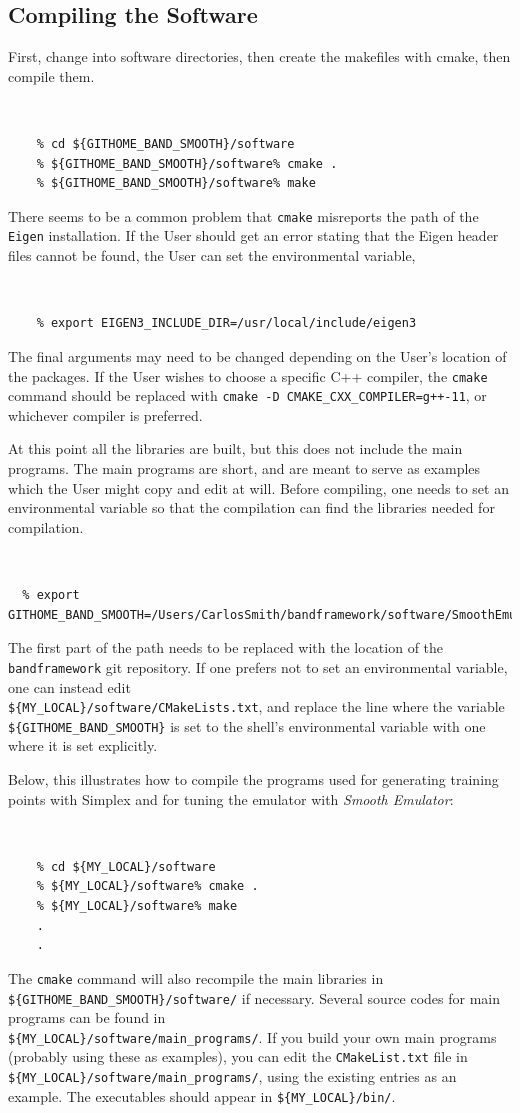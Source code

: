 \documentclass[UserManual.tex]{subfiles}
\begin{document}
\subsection{Compiling the Software}

First, change into software directories, then create the makefiles with cmake, then compile them.
{\tt 
\begin{verbatim}
    % cd ${GITHOME_BAND_SMOOTH}/software
    % ${GITHOME_BAND_SMOOTH}/software% cmake .
    % ${GITHOME_BAND_SMOOTH}/software% make
\end{verbatim}
}
There seems to be a common problem that {\tt cmake} misreports the path of the {\tt Eigen} installation. If the User should get an error stating that the Eigen header files cannot be found, the User can set the environmental variable,
{\tt 
\begin{verbatim}
    % export EIGEN3_INCLUDE_DIR=/usr/local/include/eigen3
\end{verbatim}
}
The final arguments may need to be changed depending on the User's location of the packages. If the User wishes to choose a specific C++ compiler, the {\tt cmake} command should be replaced with {\tt cmake -D CMAKE\_CXX\_COMPILER=g++-11}, or whichever compiler is preferred. 

At this point all the libraries are built, but this does not include the main programs. The main programs are short, and are meant to serve as examples which the User might copy and edit at will. Before compiling, one needs to set an environmental variable so that the compilation can find the libraries needed for compilation.
{\tt
\begin{verbatim}
  % export GITHOME_BAND_SMOOTH=/Users/CarlosSmith/bandframework/software/SmoothEmulator
\end{verbatim}
}
The first part of the path needs to be replaced with the location of the {\tt bandframework} git repository. If one prefers not to set an environmental variable, one can instead edit\\
{\tt \$\{MY\_LOCAL\}/software/CMakeLists.txt}, and replace the line where the variable {\tt \$\{GITHOME\_BAND\_SMOOTH\}} is set to the shell's environmental variable with one where it is set explicitly.

Below, this illustrates how to compile the programs used for generating training points with Simplex and for tuning the emulator with {\it Smooth Emulator}:
{\tt
\begin{verbatim}
    % cd ${MY_LOCAL}/software
    % ${MY_LOCAL}/software% cmake .
    % ${MY_LOCAL}/software% make
    .
    .
\end{verbatim}
}
The {\tt cmake} command will also recompile the main libraries in {\tt \$\{GITHOME\_BAND\_SMOOTH\}/software/} if necessary. Several source codes for main programs can be found in\\
{\tt \$\{MY\_LOCAL\}/software/main\_programs/}. If you build your own main programs (probably using these as examples), you can edit the {\tt CMakeList.txt} file in {\tt \$\{MY\_LOCAL\}/software/main\_programs/}, using the existing entries as an example. The executables should appear in {\tt \$\{MY\_LOCAL\}/bin/}. 
\end{document}
